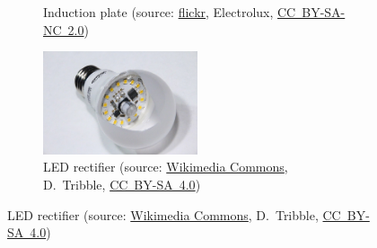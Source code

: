 \begin{frame}[c]
\begin{figure}
\begin{subfigure}[b]{0.49\textwidth}
			\caption{Induction plate (source: \href{https://www.flickr.com/photos/electrolux-design-lab/6035618944}{flickr}, Electrolux, \href{https://creativecommons.org/licenses/by-nc/2.0/}{CC~BY-SA-NC~2.0})}
		\end{subfigure}
		\hfill
		\begin{subfigure}[b]{0.49\textwidth}
			\centering
			\includegraphics[width=0.5\textwidth]{fig/lec01/LED_light_bulb.jpg}
			\caption{LED rectifier (source: \href{https://commons.wikimedia.org/wiki/File:LED-E27-Light-Bulb-1134.jpg}{Wikimedia Commons}, D.~Tribble, \href{https://creativecommons.org/licenses/by-sa/4.0/deed.en}{CC~BY-SA~4.0})}
		\end{subfigure}
	\end{figure}
\end{frame}

